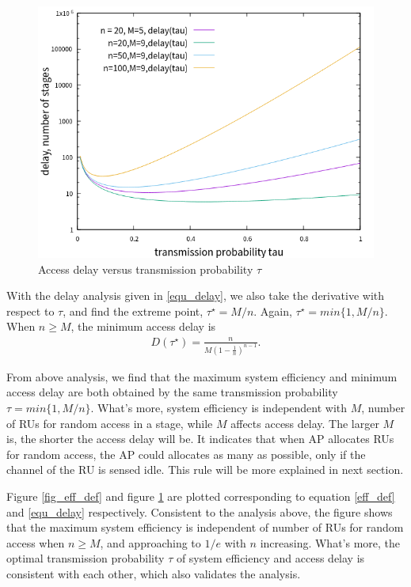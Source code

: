 \begin{figure}[!ht]
\includegraphics[scale=.54]{./figure/delay_tau.png}
\caption{Access delay versus transmission probability $\tau$}
\label{fig_delay_def}
\end{figure}

With the delay analysis given in \ref{equ_delay}, we also take the derivative with respect to $\tau$, and find the extreme point, $\tau^\star = M/n$. Again, $\tau^\star = min\lbrace 1, M/n\rbrace$. 
When $n\geq M$, the minimum access delay is 
\begin{align}
\label{equ_min_delay}
D(\tau^\star) = \frac{n}{M(1-\frac{1}{n})^{n-1}}.
\end{align}

From above analysis, we find that the maximum system efficiency and minimum access delay are both obtained by the same transmission probability $\tau = min\lbrace 1, M/n\rbrace$.
What's more, system efficiency is independent with $M$, number of RUs for random access in a stage, while $M$ affects access delay. 
The larger $M$ is, the shorter the access delay will be. 
It indicates that when AP allocates RUs for random access, the AP could allocates as many as possible, only if the channel of the RU is sensed idle. 
This rule will be more explained in next section.

Figure \ref{fig_eff_def} and figure \ref{fig_delay_def} are plotted corresponding to equation \ref{eff_def} and \ref{equ_delay} respectively.
Consistent to the analysis above, the figure shows that the maximum system efficiency is independent of number of RUs for random access when $n\geq M$, and approaching to $1/e$ with $n$ increasing. 
What's more, the optimal transmission probability $\tau$ of system efficiency and access delay is consistent with each other, which also validates the analysis. 

